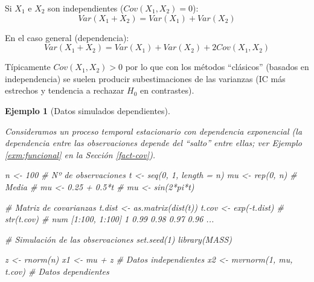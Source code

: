 \documentclass[
]{book}
\newenvironment{Shaded}{\begin{snugshade}}{\end{snugshade}}
\newcommand{\AttributeTok}[1]{\textcolor[rgb]{0.77,0.63,0.00}{#1}}
\newcommand{\CommentTok}[1]{\textcolor[rgb]{0.56,0.35,0.01}{\textit{#1}}}
\newcommand{\DecValTok}[1]{\textcolor[rgb]{0.00,0.00,0.81}{#1}}
\newcommand{\FunctionTok}[1]{\textcolor[rgb]{0.00,0.00,0.00}{#1}}
\newcommand{\NormalTok}[1]{#1}
\newcommand{\OtherTok}[1]{\textcolor[rgb]{0.56,0.35,0.01}{#1}}
\newcommand{\SpecialCharTok}[1]{\textcolor[rgb]{0.00,0.00,0.00}{#1}}
\theoremstyle{break}
\newtheorem{example}{Ejemplo}[chapter]
\theoremstyle{nonumberplain}
\begin{document}
Si \(X_{1}\) e \(X_{2}\) son independientes (\(Cov(X_{1},X_{2})=0\)):
\[Var(X_{1}+X_{2})=Var(X_{1})+Var(X_{2})\]

En el caso general (dependencia):
\[Var(X_{1}+X_{2})=Var(X_{1})+Var(X_{2})+2Cov(X_{1},X_{2})\]

Típicamente \(Cov(X_{1},X_{2})>0\) por lo que con los métodos
``clásicos'' (basados en independencia) se suelen producir
subestimaciones de las varianzas (IC más estrechos y tendencia a
rechazar \(H_{0}\) en contrastes).

\begin{example}[Datos simulados dependientes]
\protect\hypertarget{exm:sim-dep}{}\label{exm:sim-dep}

Consideramos un proceso temporal estacionario con dependencia exponencial
(la dependencia entre las observaciones depende del ``salto'' entre ellas;
ver Ejemplo \ref{exm:funcional} en la Sección \ref{fact-cov}).

\begin{Shaded}
\begin{Highlighting}[]
\NormalTok{n }\OtherTok{\textless{}{-}} \DecValTok{100}          \CommentTok{\# Nº de observaciones}
\NormalTok{t }\OtherTok{\textless{}{-}} \FunctionTok{seq}\NormalTok{(}\DecValTok{0}\NormalTok{, }\DecValTok{1}\NormalTok{, }\AttributeTok{length =}\NormalTok{ n)}
\NormalTok{mu }\OtherTok{\textless{}{-}} \FunctionTok{rep}\NormalTok{(}\DecValTok{0}\NormalTok{, n)   }\CommentTok{\# Media}
\CommentTok{\# mu \textless{}{-} 0.25 + 0.5*t}
\CommentTok{\# mu \textless{}{-} sin(2*pi*t)}

\CommentTok{\# Matriz de covarianzas}
\NormalTok{t.dist }\OtherTok{\textless{}{-}} \FunctionTok{as.matrix}\NormalTok{(}\FunctionTok{dist}\NormalTok{(t))}
\NormalTok{t.cov }\OtherTok{\textless{}{-}} \FunctionTok{exp}\NormalTok{(}\SpecialCharTok{{-}}\NormalTok{t.dist)}
\CommentTok{\# str(t.cov)}
\CommentTok{\# num [1:100, 1:100] 1 0.99 0.98 0.97 0.96 ...}

\CommentTok{\# Simulación de las observaciones}
\FunctionTok{set.seed}\NormalTok{(}\DecValTok{1}\NormalTok{)}
\FunctionTok{library}\NormalTok{(MASS)}

\NormalTok{z }\OtherTok{\textless{}{-}} \FunctionTok{rnorm}\NormalTok{(n)}
\NormalTok{x1 }\OtherTok{\textless{}{-}}\NormalTok{ mu }\SpecialCharTok{+}\NormalTok{ z }\CommentTok{\# Datos independientes}
\NormalTok{x2 }\OtherTok{\textless{}{-}} \FunctionTok{mvrnorm}\NormalTok{(}\DecValTok{1}\NormalTok{, mu, t.cov) }\CommentTok{\# Datos dependientes}


\end{Highlighting}
\end{Shaded}
\end{example}
\end{document}

